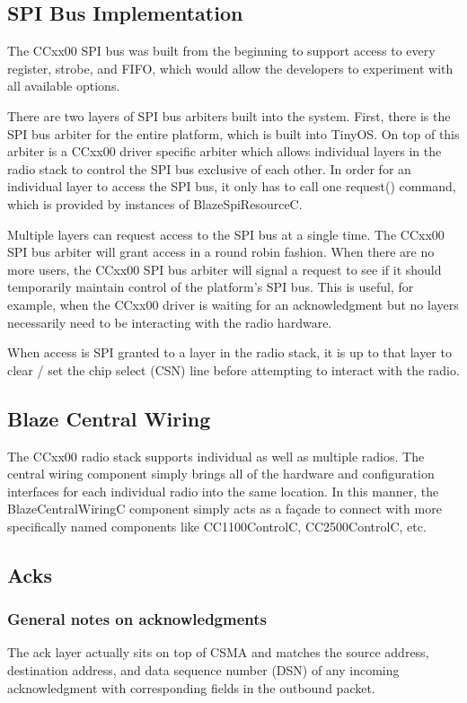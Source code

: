 \documentclass{article}
\begin{document}
\subsection{SPI Bus Implementation}
\label{sec:spibus}
The CCxx00 SPI bus was built from the beginning to support access to every register,
strobe, and FIFO, which would allow the developers to experiment with all available 
options.

There are two layers of SPI bus arbiters built into the system. First, there is
the SPI bus arbiter for the entire platform, which is built into TinyOS. On top of 
this arbiter is a CCxx00 driver specific arbiter which allows individual layers 
in the radio stack to control the SPI bus exclusive of each other.
In order for an individual layer to access the SPI bus, it only has to call one 
request() command, which is provided by instances of BlazeSpiResourceC. 

Multiple layers can request access to the SPI bus at a single time. The CCxx00
SPI bus arbiter will grant access in a round robin fashion.  When there are no
more users, the CCxx00 SPI bus arbiter will signal a request to see if it
should temporarily maintain control of the platform's SPI bus. This is useful,
for example, when the CCxx00 driver is waiting for an acknowledgment but no layers
necessarily need to be interacting with the radio hardware.

When access is SPI granted to a layer in the radio stack, it is up to that layer
to clear / set the chip select (CSN) line before attempting to interact with the
radio.

\subsection{Blaze Central Wiring}
\label{sec:centralwiring}
The CCxx00 radio stack supports individual as well as multiple radios.  The 
central wiring component simply brings all of the hardware and configuration
interfaces for each individual radio into the same location.  In this manner,
the BlazeCentralWiringC component simply acts as a fa\c{c}ade to connect with
more specifically named components like CC1100ControlC, CC2500ControlC, etc.


\subsection{Acks}
\label{sec:acks}
\subsubsection{General notes on acknowledgments}
The ack layer actually sits on top of CSMA and matches the source address,
destination address, and data sequence number (DSN) of any incoming acknowledgment
with corresponding fields in the outbound packet.
\end{document}
